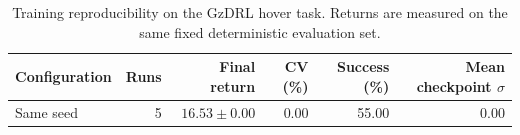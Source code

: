 \begin{table}[t]
\centering
\caption{Training reproducibility on the GzDRL hover task. Returns are measured on the same fixed deterministic evaluation set.}
\label{tab:training_reproducibility}
\footnotesize
\setlength{\tabcolsep}{3.5pt}
\renewcommand{\arraystretch}{1.15}
\begin{tabular}{lrrrrr}
\toprule
\textbf{Configuration} & \textbf{Runs} & \textbf{Final return} & \textbf{CV (\%)} & \textbf{Success (\%)} & \makecell{\textbf{Mean checkpoint}\\\textbf{$\sigma$}} \\
\midrule
Same seed & 5 & $16.53 \pm 0.00$ & 0.00 & 55.00 & 0.00 \\
\bottomrule
\end{tabular}
\end{table}
